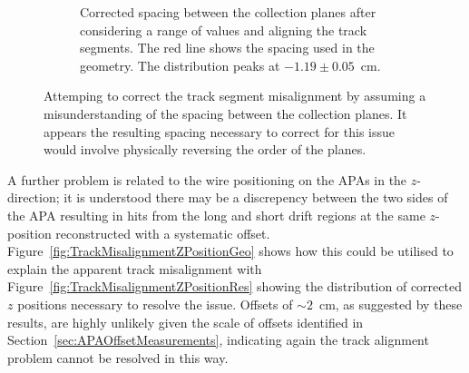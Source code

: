 \begin{figure}
\begin{subfigure}[t]{0.48\linewidth}
    \caption{Corrected spacing between the collection planes after considering a range of values and aligning the track segments.  The red line shows the spacing used in the geometry.  The distribution peaks at $-1.19\pm0.05$~cm.}
    \label{fig:TrackMisalignmentCollectionSpacingRes}
  \end{subfigure}
  \caption[Attemping to correct the track segment misalignment by assuming a misunderstanding of the spacing between the collection planes.]{Attemping to correct the track segment misalignment by assuming a misunderstanding of the spacing between the collection planes.  It appears the resulting spacing necessary to correct for this issue would involve physically reversing the order of the planes.}
  \label{fig:TrackMisalignmentCollectionSpacing}
\end{figure}

A further problem is related to the wire positioning on the APAs in the $z$-direction; it is understood there may be a discrepency between the two sides of the APA resulting in hits from the long and short drift regions at the same $z$-position reconstructed with a systematic offset.  Figure~\ref{fig:TrackMisalignmentZPositionGeo} shows how this could be utilised to explain the apparent track misalignment with Figure~\ref{fig:TrackMisalignmentZPositionRes} showing the distribution of corrected $z$ positions necessary to resolve the issue.  Offsets of $\sim2$~cm, as suggested by these results, are highly unlikely given the scale of offsets identified in Section~\ref{sec:APAOffsetMeasurements}, indicating again the track alignment problem cannot be resolved in this way.

